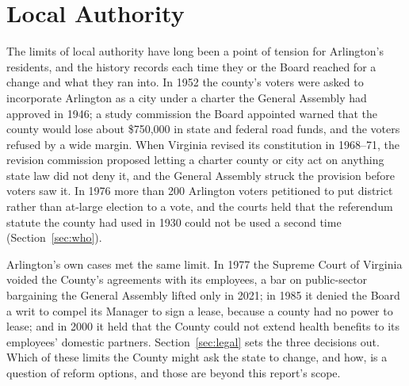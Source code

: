 \section{Local Authority}

The limits of local authority have long been a point of tension for Arlington's
residents, and the history records each time they or the Board reached for a
change and what they ran into. In 1952 the county's voters were asked to
incorporate Arlington as a city under a charter the General Assembly had approved
in 1946; a study commission the Board appointed warned that the county would lose
about \$750,000 in state and federal road funds, and the voters refused by a wide
margin.\autocite{dailysun1952results} When Virginia revised its constitution in
1968--71, the revision commission proposed letting a charter county or city act on
anything state law did not deny it, and the General Assembly struck the provision
before voters saw it.\autocite[200]{schragger2022} In 1976 more than 200 Arlington
voters petitioned to put district rather than at-large election to a vote, and the
courts held that the referendum statute the county had used in 1930 could not be
used a second time (Section~\ref{sec:who}).\autocite{vollinelectoralboard}

Arlington's own cases met the same limit. In 1977 the Supreme Court of Virginia
voided the County's agreements with its employees, a bar on public-sector
bargaining the General Assembly lifted only in
2021;\autocite{commonwealthvarlington1977} in 1985 it denied the Board a writ to
compel its Manager to sign a lease, because a county had no power to
lease;\autocite{brownvarlington1985} and in 2000 it held that the County could not
extend health benefits to its employees' domestic
partners.\autocite{arlingtonvwhite2000} Section~\ref{sec:legal} sets the three
decisions out. Which of these limits the County might ask the state to change, and
how, is a question of reform options, and those are beyond this report's scope.

